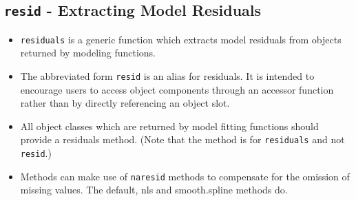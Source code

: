 \documentclass[residuals.tex]{subfiles}
\begin{document}
\Large
\newpage
\subsection{\texttt{resid} - Extracting Model Residuals}


\begin{itemize}
\item \texttt{residuals} is a generic function which extracts model residuals from objects returned by modeling functions. 

\item The abbreviated form \texttt{resid} is an alias for residuals. It is intended to encourage users to access object components through an accessor function rather than by directly referencing an object slot. 

\item All object classes which are returned by model fitting functions should provide a residuals method. (Note that the method is for \texttt{residuals} and not \texttt{resid}.) 

\item Methods can make use of \texttt{naresid} methods to compensate for the omission of missing values. The default, nls and smooth.spline methods do. 
\end{itemize}
\end{document}
